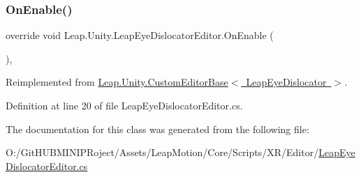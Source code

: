 \subsubsection{\texorpdfstring{OnEnable()}{OnEnable()}}
{\footnotesize\ttfamily override void Leap.\+Unity.\+Leap\+Eye\+Dislocator\+Editor.\+On\+Enable (\begin{DoxyParamCaption}{ }\end{DoxyParamCaption})\hspace{0.3cm}{\ttfamily [protected]}, {\ttfamily [virtual]}}



Reimplemented from \mbox{\hyperlink{class_leap_1_1_unity_1_1_custom_editor_base_a2268bc01655342bd3da5ae015bfa2f93}{Leap.\+Unity.\+Custom\+Editor\+Base$<$ Leap\+Eye\+Dislocator $>$}}.



Definition at line 20 of file Leap\+Eye\+Dislocator\+Editor.\+cs.



The documentation for this class was generated from the following file\+:\begin{DoxyCompactItemize}
\item 
O\+:/\+Git\+H\+U\+B\+M\+I\+N\+I\+P\+Roject/\+Assets/\+Leap\+Motion/\+Core/\+Scripts/\+X\+R/\+Editor/\mbox{\hyperlink{_leap_eye_dislocator_editor_8cs}{Leap\+Eye\+Dislocator\+Editor.\+cs}}\end{DoxyCompactItemize}
